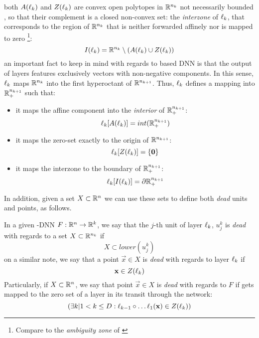 both $A(\ell_k)$ and $Z(\ell_k)$ are convex open polytopes in $\mathbb{R}^{n_k}$ not necessarily bounded \cite{florenzano2001ConvexAnalysis,reyRiera2019ModellingClassificationReLU}, so that their complement is a closed non-convex set: the \emph{interzone} of $\ell_k$, that corresponds to the region of $\mathbb{R}^{n_k}$ that is neither forwarded affinely nor is mapped to zero \footnote{Compare to the \emph{ambiguity zone} of \cite{reyRiera2019ModellingClassificationReLU}}:
\begin{equation}\label{eq:interzone}
    I(\ell_k) = \mathbb{R}^{n_k}\setminus(A(\ell_k)\cup Z(\ell_k))
\end{equation}
an important fact to keep in mind with regards to \ReLU based DNN is that the output of layers features exclusively vectors with non-negative components. In this sense, $\ell_k$ maps $\mathbb{R}^{n_k}$ into the first hyperoctant of $\mathbb{R}^{n_{k+1}}$.
Thus, $\ell_k$ defines a mapping into $\mathbb{R}^{n_{k+1}}_{+}$ such that: 
\begin{itemize}
    \item it maps the affine component into the \emph{interior} of $\mathbb{R}^{n_{k+1}}_{+}$: $$\ell_k[A(\ell_k)] = int(\mathbb{R}^{n_{k+1}}_{+})$$
    \item it maps the zero-set exactly to the origin of $\mathbb{R}^{n_{k+1}}$:$$\ell_k[Z(\ell_k)] = \{\mathbf{0}\}$$
    \item it maps the interzone to the boundary of $\mathbb{R}^{n_{k+1}}_{+}$: $$\ell_k[I(\ell_k)] = \partial\mathbb{R}^{n_{k+1}}_{+}$$
\end{itemize}
In addition, given a set $X\subset\mathbb{R}^{n}$ we can use these sets to define both \emph{dead} units and points, as follows. 
\begin{remark}\label{remark:deadItems}
In a given \ReLU-DNN $F:\mathbb{R}^{n}\rightarrow\mathbb{R}^{k}$, we say that the $j$-th unit of layer $\ell_k$, $u_j^k$ is \emph{dead} with regards to a set $X\subset\mathbb{R}^{n_k}$ if 
\begin{equation}\label{eq:defDeadUnit}
X\subset lower(u_j^k)
\end{equation}
on a similar note, we say that a point $\vec{x}\in X$ is \emph{dead} with regards to layer $\ell_k$ if 
\begin{equation}
    \mathbf{x}\in Z(\ell_k)
\end{equation}
Particularly, if $X\subset\mathbb{R}^{n}$, we say that point $\vec{x}\in X$ is \emph{dead} with regards to $F$ if gets mapped to the zero set of a layer in its transit through the network: 
\begin{equation}
    (\exists k| 1 < k \leq D: \ell_{k-1}\circ\ldots\ell_1(\mathbf{x})\in Z(\ell_k))
\end{equation}
\end{remark}
